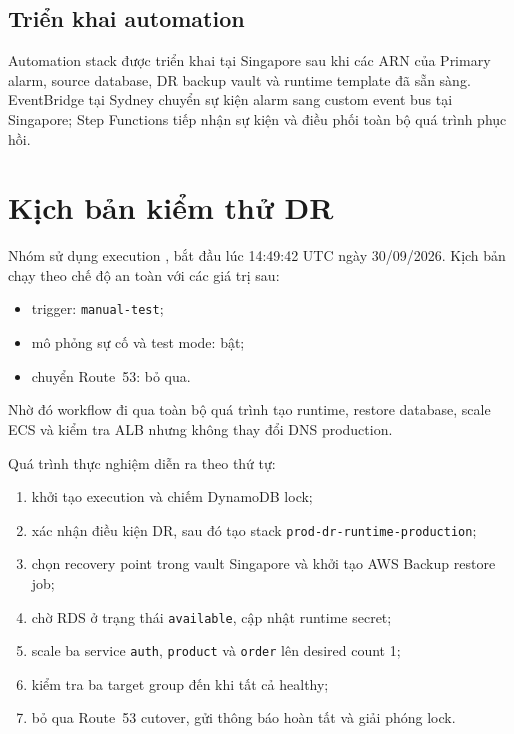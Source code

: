 \subsection{Triển khai automation}

Automation stack được triển khai tại Singapore sau khi các ARN của Primary alarm, source database, DR backup vault và runtime template đã sẵn sàng. EventBridge tại Sydney chuyển sự kiện alarm sang custom event bus tại Singapore; Step Functions tiếp nhận sự kiện và điều phối toàn bộ quá trình phục hồi.

\section{Kịch bản kiểm thử DR}

Nhóm sử dụng execution , bắt đầu lúc 14:49:42 UTC ngày 30/09/2026. Kịch bản chạy theo chế độ an toàn với các giá trị sau:

\begin{itemize}
  \item trigger: \texttt{manual-test};
  \item mô phỏng sự cố và test mode: bật;
  \item chuyển Route~53: bỏ qua.
\end{itemize}

Nhờ đó workflow đi qua toàn bộ quá trình tạo runtime, restore database, scale ECS và kiểm tra ALB nhưng không thay đổi DNS production.

Quá trình thực nghiệm diễn ra theo thứ tự:

\begin{enumerate}
  \item khởi tạo execution và chiếm DynamoDB lock;
  \item xác nhận điều kiện DR, sau đó tạo stack \texttt{prod-dr-runtime-production};
  \item chọn recovery point trong vault Singapore và khởi tạo AWS Backup restore job;
  \item chờ RDS ở trạng thái \texttt{available}, cập nhật runtime secret;
  \item scale ba service \texttt{auth}, \texttt{product} và \texttt{order} lên desired count 1;
  \item kiểm tra ba target group đến khi tất cả healthy;
  \item bỏ qua Route~53 cutover, gửi thông báo hoàn tất và giải phóng lock.
\end{enumerate}

